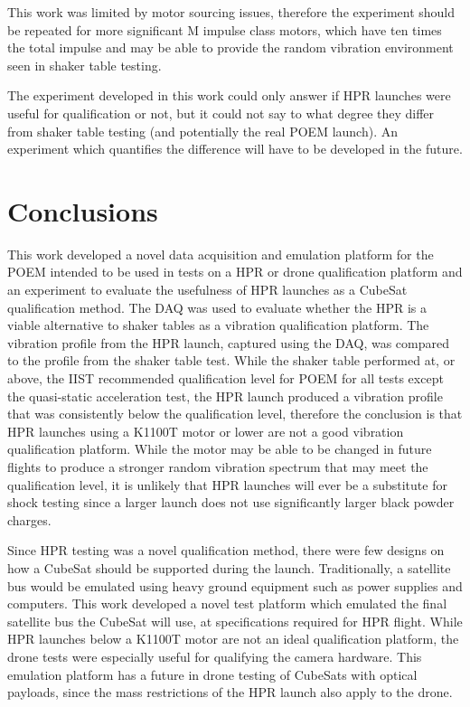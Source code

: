 \documentclass{report}
\begin{document}
This work was limited by motor sourcing issues, therefore the experiment should be repeated for more significant M impulse class motors, which have ten times the total impulse and may be able to provide the random vibration environment seen in shaker table testing.

The experiment developed in this work could only answer if HPR launches were useful for qualification or not, but it could not say to what degree they differ from shaker table testing (and potentially the real POEM launch). An experiment which quantifies the difference will have to be developed in the future.

\section{Conclusions}

This work developed a novel data acquisition and emulation platform for the POEM intended to be used in tests on a HPR or drone qualification platform and an experiment to evaluate the usefulness of HPR launches as a CubeSat qualification method. The DAQ was used to evaluate whether the HPR is a viable alternative to shaker tables as a vibration qualification platform. The vibration profile from the HPR launch, captured using the DAQ, was compared to the profile from the shaker table test. While the shaker table performed at, or above, the IIST recommended qualification level for POEM for all tests except the quasi-static acceleration test, the HPR launch produced a vibration profile that was consistently below the qualification level, therefore the conclusion is that HPR launches using a K1100T motor or lower are not a good vibration qualification platform. While the motor may be able to be changed in future flights to produce a stronger random vibration spectrum that may meet the qualification level, it is unlikely that HPR launches will ever be a substitute for shock testing since a larger launch does not use significantly larger black powder charges.

Since HPR testing was a novel qualification method, there were few designs on how a CubeSat should be supported during the launch. Traditionally, a satellite bus would be emulated using heavy ground equipment such as power supplies and computers. This work developed a novel test platform which emulated the final satellite bus the CubeSat will use, at specifications required for HPR flight. While HPR launches below a K1100T motor are not an ideal qualification platform, the drone tests were especially useful for qualifying the camera hardware. This emulation platform has a future in drone testing of CubeSats with optical payloads, since the mass restrictions of the HPR launch also apply to the drone.
\end{document}
